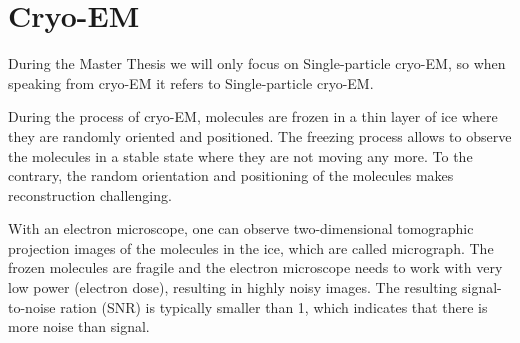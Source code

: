 \section{Cryo-EM}
During the Master Thesis we will only focus on Single-particle cryo-EM, so when speaking from cryo-EM
it refers to Single-particle cryo-EM.

During the process of cryo-EM, molecules are frozen in a thin layer of ice
where they are randomly oriented and positioned. 
The freezing process allows to observe the molecules in a stable state where they are not moving any more.
To the contrary, the random orientation and positioning of the molecules makes reconstruction challenging\cite{singleParticleCryoEm}.

With an electron microscope, one can observe two-dimensional tomographic projection images of the molecules in the ice,
which are called micrograph. The frozen molecules are fragile and the electron microscope needs to work with
very low power (electron dose), resulting in highly noisy images. The resulting signal-to-noise ration (SNR)
is typically smaller than 1, which indicates that there is more noise than signal\cite{cryoEmMath2}.





